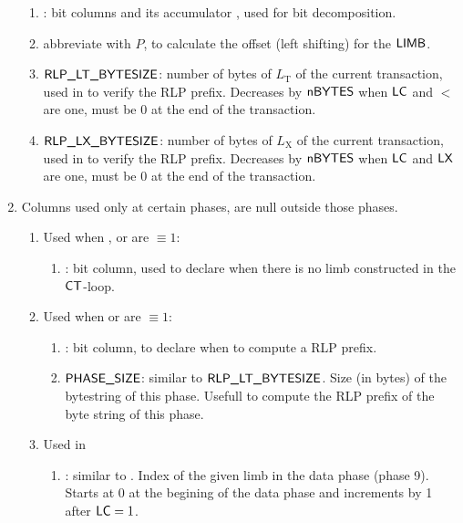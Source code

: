\begin{enumerate}
\begin{enumerate}
            \item \genBit{}:
                bit columns and its accumulator \genBitAcc{}, used for bit decomposition.
            \item \Power{} abbreviate with $P$, to calculate the offset (left shifting) for the $\textsf{LIMB}$.
            \item $\textsf{RLP\_LT\_BYTESIZE}$:
                number of bytes of $L_{\mathrm{T}}$ of the current transaction, used in \phaseRlpPrefix{} to verify the RLP prefix. Decreases by $\textsf{nBYTES}$ when $\textsf{LC}$ and $\lt$ are one, must be 0 at the end of the transaction.
            \item $\textsf{RLP\_LX\_BYTESIZE}$:
                number of bytes of $L_{\mathrm{X}}$ of the current transaction, used in \phaseRlpPrefix{} to verify the RLP prefix. Decreases by $\textsf{nBYTES}$ when $\textsf{LC}$ and $\textsf{LX}$ are one, must be 0 at the end of the transaction.
        \end{enumerate}
    \item Columns used only at certain phases, are null outside those phases.
        \begin{enumerate}
            \item Used when \phaseRlpPrefix{}, \phaseData{} or \phaseBeta{} are $\equiv 1$:
                \begin{enumerate}
                    \item \ispadding:
                        bit column, used to declare when there is no limb constructed in the $\textsf{CT}$-loop.
                \end{enumerate}
            \item Used when \phaseData{} or \phaseAccessList{} are $\equiv 1$:
                \begin{enumerate}
                    \item \isprefix:
                        bit column, to declare when to compute a RLP prefix.
                    \item $\textsf{PHASE\_SIZE}$:
                        similar to $\textsf{RLP\_LT\_BYTESIZE}$. Size (in bytes) of the bytestring of this phase. Usefull to compute the RLP prefix of the byte string of this phase.
                \end{enumerate}
            \item Used in \phaseData{}
                \begin{enumerate}
                    \item \indexData{}:
                        similar to \index. Index of the given limb in the data phase (phase 9). Starts at 0 at the begining of the data phase and increments by 1 after $\textsf{LC} = 1$.

\end{enumerate}
\end{enumerate}
\end{enumerate}
